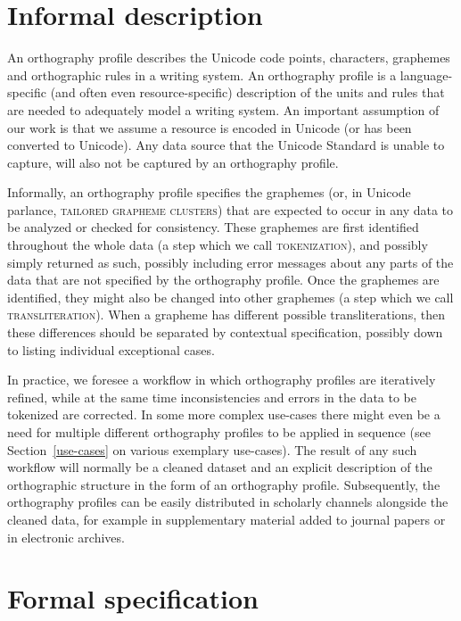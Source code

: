 \section{Informal description}
\label{informal-description-of-orthography-profiles}

An orthography profile describes the Unicode code points, characters, graphemes
and orthographic rules in a writing system. An orthography profile is a
language-specific (and often even resource-specific) description of the units
and rules that are needed to adequately model a writing system. An important
assumption of our work is that we assume a resource is encoded in Unicode (or
has been converted to Unicode). Any data source that the Unicode Standard is
unable to capture, will also not be captured by an orthography profile.

Informally, an orthography profile specifies the graphemes (or, in Unicode
parlance, \textsc{tailored grapheme clusters}) that are expected to occur in any
data to be analyzed or checked for consistency. These graphemes are first
identified throughout the whole data (a step which we call
\textsc{tokenization}), and possibly simply returned as such, possibly including
error messages about any parts of the data that are not specified by the
orthography profile. Once the graphemes are identified, they might also be
changed into other graphemes (a step which we call \textsc{transliteration}).
When a grapheme has different possible transliterations, then these differences
should be separated by contextual specification, possibly down to listing
individual exceptional cases.

In practice, we foresee a workflow in which orthography profiles are iteratively
refined, while at the same time inconsistencies and errors in the data to be
tokenized are corrected. In some more complex use-cases there might even be a
need for multiple different orthography profiles to be applied in sequence (see
Section~\ref{use-cases} on various exemplary use-cases). The result of any such
workflow will normally be a cleaned dataset and an explicit description of the
orthographic structure in the form of an orthography profile. Subsequently, the
orthography profiles can be easily distributed in scholarly channels alongside
the cleaned data, for example in supplementary material added to journal papers
or in electronic archives.

\section{Formal specification}
\label{formal-specification-of-orthography-profiles}

